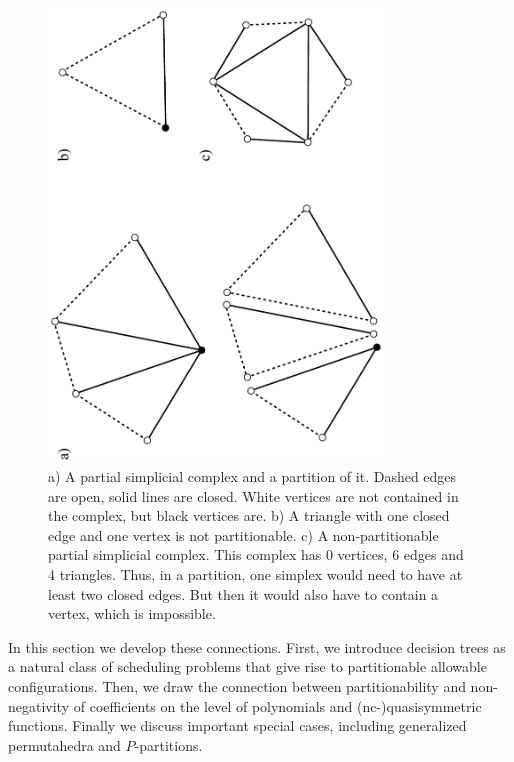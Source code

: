 \documentclass[12pt,reqno]{amsart}
\numberwithin{definition}{section}
\theoremstyle{definition}
\begin{document}
\begin{figure}[h]
\includegraphics[angle=270,width=3.5in]{partitions}
\caption{a) A partial simplicial complex and a partition of it. Dashed edges are open, solid lines are closed. White vertices are not contained in the complex, but black vertices are. b) A triangle with one closed edge and one vertex is not partitionable. c) A non-partitionable partial simplicial complex. This complex has 0 vertices, 6 edges and 4 triangles. Thus, in a partition, one simplex would need to have at least two closed edges. But then it would also have to contain a vertex, which is impossible.}
\label{fig:partitionability}
\end{figure}

In this section we develop these connections. First, we introduce decision trees as a natural class of scheduling problems that give rise to partitionable allowable configurations. Then, we draw the connection between partitionability and non-negativity of coefficients on the level of polynomials and (nc-)quasisymmetric functions. Finally we discuss important special cases, including generalized permutahedra and $P$-partitions.
\end{document}
